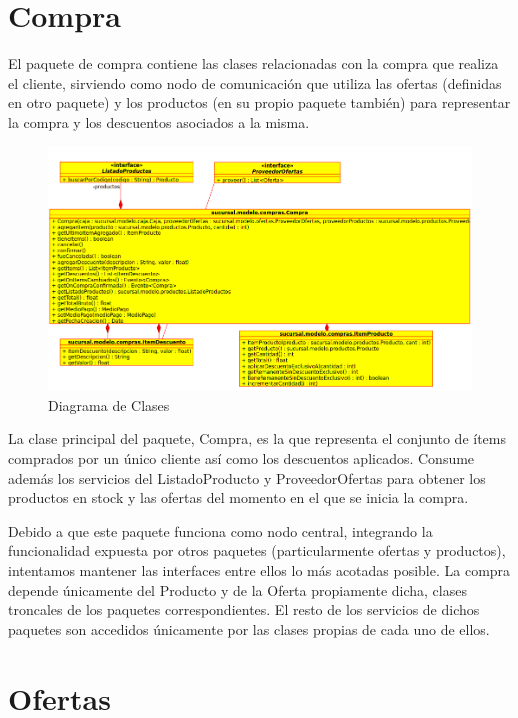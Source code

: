 \documentclass[a4paper,11pt]{article}
\begin{document}
\section{Compra}

El paquete de compra contiene las clases relacionadas con la compra que realiza
el cliente, sirviendo como nodo de comunicación que utiliza las ofertas
(definidas en otro paquete) y los productos (en su propio paquete también) para
representar la compra y los descuentos asociados a la misma.

\begin{figure}[!htp]
\begin{center}
\includegraphics[width=1\textwidth]{src/docs/compras.png}
\end{center}
\caption{Diagrama de Clases} \label{fig:compra}
\end{figure}

\FloatBarrier

La clase principal del paquete, Compra, es la que representa el conjunto de
ítems comprados por un único cliente así como los descuentos aplicados. Consume
además los servicios del ListadoProducto y ProveedorOfertas para obtener los
productos en stock y las ofertas del momento en el que se inicia la compra.

Debido a que este paquete funciona como nodo central, integrando la
funcionalidad expuesta por otros paquetes (particularmente ofertas y
productos), intentamos mantener las interfaces entre ellos lo más acotadas
posible. La compra depende únicamente del Producto y de la Oferta propiamente
dicha, clases troncales de los paquetes correspondientes. El resto de los
servicios de dichos paquetes son accedidos únicamente por las clases propias de
cada uno de ellos.

\section{Ofertas}
\end{document}
